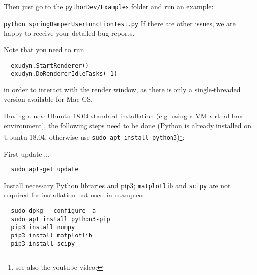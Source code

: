 \ei
Then just go to the \texttt{pythonDev/Examples} folder and run an example:
\bi
  \item[] \texttt{python springDamperUserFunctionTest.py}
\ei
If there are other issues, we are happy to receive your detailed bug reports. 

\noindent Note that you need to run 
\pythonstyle\begin{lstlisting}
  exudyn.StartRenderer()
  exudyn.DoRendererIdleTasks(-1)
\end{lstlisting}
in order to interact with the render window, as there is only a single-threaded version available for Mac OS.

%
Having a new Ubuntu 18.04 standard installation (e.g. using a VM virtual box environment), the following steps need to be done (Python  is already installed on Ubuntu 18.04, otherwise use \texttt{sudo apt install python3})\footnote{see also the youtube video: }:

\noindent First update ...
\plainlststyle
\begin{lstlisting}
  sudo apt-get update
\end{lstlisting}

\noindent 
Install necessary Python libraries and pip3; \texttt{matplotlib} and \texttt{scipy} are not required for installation but used in \codeName examples:
\begin{lstlisting}
  sudo dpkg --configure -a
  sudo apt install python3-pip
  pip3 install numpy
  pip3 install matplotlib
  pip3 install scipy
\end{lstlisting}

